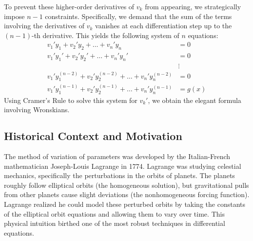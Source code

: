 \documentclass[12pt]{article}
\begin{document}
To prevent these higher-order derivatives of $v_k$ from appearing, we strategically impose $n-1$ constraints. Specifically, we demand that the sum of the terms involving the derivatives of $v_k$ vanishes at each differentiation step up to the $(n-1)$-th derivative. 
This yields the following system of $n$ equations:
\begin{align*}
v_1' y_1 + v_2' y_2 + \dots + v_n' y_n &= 0 \\
v_1' y_1' + v_2' y_2' + \dots + v_n' y_n' &= 0 \\
&\vdots \\
v_1' y_1^{(n-2)} + v_2' y_2^{(n-2)} + \dots + v_n' y_n^{(n-2)} &= 0 \\
v_1' y_1^{(n-1)} + v_2' y_2^{(n-1)} + \dots + v_n' y_n^{(n-1)} &= g(x)
\end{align*}
Using Cramer's Rule to solve this system for $v_k'$, we obtain the elegant formula involving Wronskians.

\subsection{Historical Context and Motivation}
The method of variation of parameters was developed by the Italian-French mathematician Joseph-Louis Lagrange in 1774. Lagrange was studying celestial mechanics, specifically the perturbations in the orbits of planets. The planets roughly follow elliptical orbits (the homogeneous solution), but gravitational pulls from other planets cause slight deviations (the nonhomogeneous forcing function). Lagrange realized he could model these perturbed orbits by taking the constants of the elliptical orbit equations and allowing them to vary over time. This physical intuition birthed one of the most robust techniques in differential equations.
\end{document}

